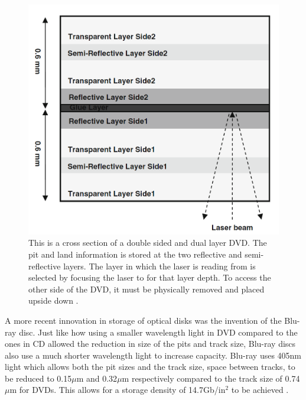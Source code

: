 \documentclass[ notitlepage, numerical, 11pt]{revtex4-1} %
\begin{document}
\begin{figure}[H]
\centerline{\includegraphics[scale=.45]{DVD.png}}
\caption{This is a cross section of a double sided and dual layer DVD. The pit and land information is stored at the two reflective and semi-reflective layers. The layer in which the laser is reading from is selected by focusing the laser to for that layer depth. To access the other side of the DVD, it must be physically removed and placed upside down \cite{memory}.}
\label{DVD}
\end{figure} 

A more recent innovation in storage of optical disks was the invention of the Blu-ray disc. Just like how using a smaller wavelength light in DVD compared to the ones in CD allowed the reduction in size of the pits and track size, Blu-ray discs also use a much shorter wavelength light to increase capacity. Blu-ray uses 405nm light which allows both the pit sizes and the track size, space between tracks, to be reduced to 0.15$\mu$m and 0.32$\mu$m respectively compared to the track size of 0.74$\mu$m for DVDs. This allows for a storage density of 14.7Gb/in$^2$ to be achieved \cite{memory}. 
\end{document}
